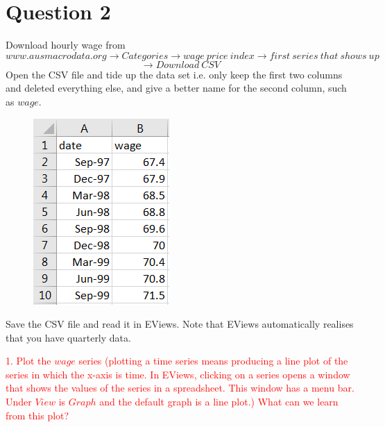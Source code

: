 \documentclass[12pt]{report}
\begin{document}
\newpage
\section*{Question 2}
\noindent Download hourly wage from $$www.ausmacrodata.org \to Categories \to wage\ price\ index \to first\ series\ that\ shows\ up$$ $$\to Download\ CSV$$ Open the CSV file and tide up the data set i.e. only keep the first two columns and deleted everything else, and give a better name for the second column, such as $wage$. 
\begin{figure}[H]
	\centerline{\includegraphics{2018sem2_q2_1}}
\end{figure}
\vspace{-\baselineskip} \noindent Save the CSV file and read it in EViews. Note that EViews automatically realises that you have quarterly data.

\noindent \textcolor{red}{1. Plot the $wage$ series (plotting a time series means producing a line plot of the series in which the x-axis is time. In EViews, clicking on a series opens a window that shows the values of the series in a spreadsheet. This window has a menu bar. Under $View$ is $Graph$ and the default graph is a line plot.) What can we learn from this plot?}
\end{document}
